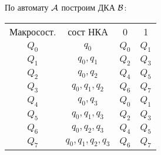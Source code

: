 \documentclass[12pt]{article}
\theoremstyle{definiton}
\theoremstyle{definition}
\theoremstyle{definition}
\def\A{{\cal A}}
\def\B{{\cal B}}
\begin{document}
По автомату $\A$ построим ДКА $\B$:
\begin{tabular}{cccc}
Макросост. & сост НКА & 0 & 1 \\
$Q_0$ & $q_0$ & $Q_0$ & $Q_1$ \\
$Q_1$ & $q_0, q_1$ & $Q_2$ & $Q_3$ \\
$Q_2$ & $q_0, q_2$ & $Q_4$ & $Q_5$ \\
$Q_3$ & $q_0, q_1, q_2$ & $Q_6$ & $Q_7$ \\
$Q_4$ & $q_0, q_3$ & $Q_0$ & $Q_1$ \\
$Q_5$ & $q_0, q_1, q_3$ & $Q_2$ & $Q_3$ \\
$Q_6$ & $q_0, q_2, q_3$ & $Q_4$ & $Q_5$ \\
$Q_7$ & $q_0, q_1, q_2, q_3$ & $Q_6$ & $Q_7$ \\
\end{tabular}
\end{document}
